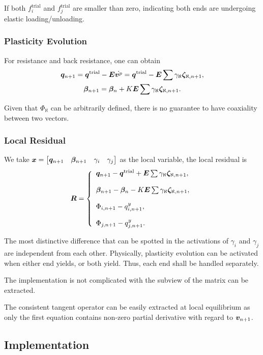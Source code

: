 If both $f^\text{trial}_i$ and $f^\text{trial}_j$ are smaller than zero, indicating both ends are undergoing elastic loading/unloading.
\subsubsection{Plasticity Evolution}
For resistance and back resistance, one can obtain
\begin{gather}
\bm{q}_{n+1}=\bm{q}^\text{trial}-\bm{E}\dot{\bm{v}^p}=\bm{q}^\text{trial}-\bm{E}\sum\gamma_\aleph\bm{\zeta}_{\aleph,n+1},\\
\bm{\beta}_{n+1}=\bm{\beta}_{n}+K\bm{E}\sum\gamma_\aleph{}\bm{\zeta}_{\aleph,n+1}.
\end{gather}

Given that $\Phi_\aleph$ can be arbitrarily defined, there is no guarantee to have coaxiality between two vectors.
\subsubsection{Local Residual}
We take $\bm{x}=\begin{bmatrix}
\bm{q}_{n+1}&\bm{\beta}_{n+1}&\gamma_i&\gamma_j
\end{bmatrix}$ as the local variable, the local residual is
\begin{gather}
\bm{R}=\left\{
\begin{array}{l}
\bm{q}_{n+1}-\bm{q}^\text{trial}+\bm{E}\sum\gamma_\aleph\bm{\zeta}_{\aleph,n+1},\\[4mm]
\bm{\beta}_{n+1}-\bm{\beta}_{n}-K\bm{E}\sum\gamma_\aleph{}\bm{\zeta}_{\aleph,n+1},\\[4mm]
\Phi_{i,n+1}-q^y_{i,n+1},\\[4mm]
\Phi_{j,n+1}-q^y_{j,n+1}.
\end{array}
\right.
\end{gather}

The most distinctive difference that can be spotted in the activations of $\gamma_i$ and $\gamma_j$ are independent from each other. Physically, plasticity evolution can be activated when either end yields, or both yield. Thus, each end shall be handled separately.

The implementation is not complicated with the subview of the matrix can be extracted.

The consistent tangent operator can be easily extracted at local equilibrium as only the first equation contains non-zero partial derivative with regard to $\bm{v}_{n+1}$.
\subsection{Implementation}